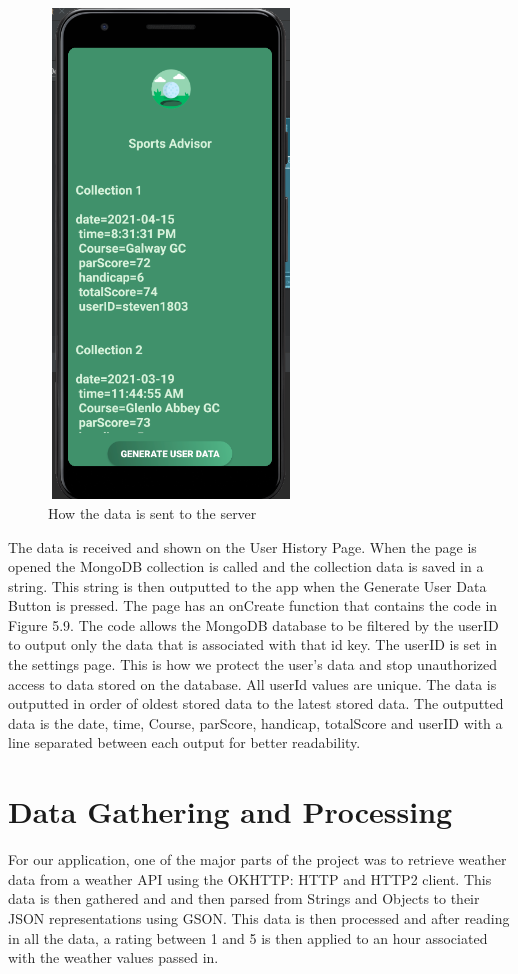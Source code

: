 \begin{figure}[H]
    \centering
    \includegraphics[width=6.5cm, height = 13cm]{img/userHistoryPage.PNG}
    \caption{How the data is sent to the server}
    \label{fig:altas config}
\end{figure}

The data is received and shown on the User History Page. When the page is opened the MongoDB collection is called and the collection data is saved in a string. This string is then outputted to the app when the Generate User Data Button is pressed. \newline
The page has an onCreate function that contains the code in Figure 5.9. The code allows the MongoDB database to be filtered by the userID to output only the data that is associated with that id key. The userID is set in the settings page. This is how we protect the user's data and stop unauthorized access to data stored on the database. All userId values are unique. The data is outputted in order of oldest stored data to the latest stored data. The outputted data is the date, time, Course, parScore, handicap, totalScore and userID with a line separated between each output for better readability.


\section{Data Gathering and Processing}
For our application, one of the major parts of the project was to retrieve weather data from a weather API using the OKHTTP: HTTP and HTTP2 client. This data is then gathered and and then parsed from Strings and Objects to their JSON representations using GSON. This data is then processed and after reading in all the data, a rating between 1 and 5 is then applied to an hour associated with the weather values passed in.

